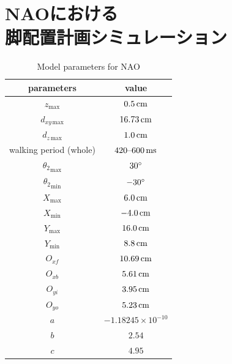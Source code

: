 \documentclass[autodetect-engine,dvipdfmx-if-dvi,ja=standard,a4j,jbase=11pt,magstyle=nomag*]{bxjsreport}
\begin{document}
\chapter[NAOにおける脚配置計画シミュレーション]{NAOにおける\\脚配置計画シミュレーション}
\label{chap:sim_nao}

\begin{table}[pt]
    \renewcommand{\arraystretch}{1.0}
    \centering
    \caption{Model parameters for NAO}
    \label{tab:sim_nao_param_model}
    \begin{tabular}{cc}
        \toprule%
        parameters                  &   value \\
        \midrule%
        $z_{\mathrm{max}}$          &   $0.5\,\si{\centi\meter}$ \\
        $d_{xy\,\mathrm{max}}$      &   $16.73\,\si{\centi\meter}$ \\
        $d_{z\,\mathrm{max}}$       &   $1.0\,\si{\centi\meter}$ \\
        walking period (whole)      &   $420\text{--}600\,\si{\milli\second}$ \\
        \midrule%
        ${\theta_2}_{\mathrm{max}}$ &   $30 \degree$ \\
        ${\theta_2}_{\mathrm{min}}$ &   $-30 \degree$ \\
        $X_{\mathrm{max}}$          &   $6.0\,\si{\centi\meter}$ \\
        $X_{\mathrm{min}}$          &   $-4.0\,\si{\centi\meter}$ \\
        $Y_{\mathrm{max}}$          &   $16.0\,\si{\centi\meter}$ \\
        $Y_{\mathrm{min}}$          &   $8.8\,\si{\centi\meter}$ \\
        $O_{xf}$                    &   $10.69\,\si{\centi\meter}$ \\
        $O_{xb}$                    &   $5.61\,\si{\centi\meter}$ \\
        $O_{yi}$                    &   $3.95\,\si{\centi\meter}$ \\
        $O_{yo}$                    &   $5.23\,\si{\centi\meter}$ \\
        $a$                         &   $-1.18245 \times 10^{-10}$ \\
        $b$                         &   $2.54$ \\
        $c$                         &   $4.95$ \\
        \bottomrule
    \end{tabular}
    \renewcommand{\arraystretch}{1.0}
\end{table}
\end{document}
